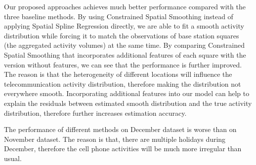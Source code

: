Our proposed approaches achieves much better performance compared with the three baseline methods. By using Constrained Spatial Smoothing instead of applying Spatial Spline Regression directly, we are able to fit a smooth activity distribution while forcing it to match the observations of base station squares (the aggregated activity volumes) at the same time. By comparing Constrained Spatial Smoothing that incorporates additional features of each square with the version without features, we can see that the performance is further improved. The reason is that the heterogeneity of different locations will influence the telecommunication activity distribution, therefore making the distribution not everywhere smooth. Incorporating additional features into our model can help to explain the residuals between estimated smooth distribution and the true activity distribution, therefore further increases estimation accuracy.

The performance of different methods on December dataset is worse than on November dataset. The reason is that, there are multiple holidays during December, therefore the cell phone activities will be much more irregular than usual. 









